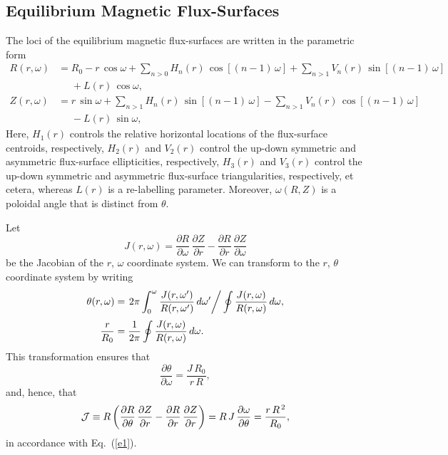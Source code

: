 \documentclass[12pt,prb,aps]{revtex4-1}
\begin{document}
\subsection{Equilibrium Magnetic Flux-Surfaces}
The loci of the equilibrium magnetic flux-surfaces are written in the parametric form\,\cite{con0,con,fitz93,greene,gim}
\begin{align}
R(r,\omega) &= R_0-r\,\cos\omega+\sum_{n>0}H_n(r)\,\cos[(n-1)\,\omega]+\sum_{n>1}V_n(r)\,\sin[(n-1)\,\omega]\nonumber\\[0.5ex]&
\phantom{=}+L(r)\,\cos\omega,\label{e10a}\\[0.5ex]
Z(r,\omega)&= r\,\sin\omega + \sum_{n>1}H_n(r)\,\sin[(n-1)\,\omega]- \sum_{n>1}V_n(r)\,\cos[(n-1)\,\omega]\nonumber\\[0.5ex]&\phantom{=}-L(r)\,\sin\omega,\label{e11a}
\end{align}
Here, $H_1(r)$  controls the relative horizontal locations of the flux-surface centroids, respectively, $H_2(r)$ and $V_2(r)$ control the 
up-down symmetric and asymmetric flux-surface ellipticities, respectively, $H_3(r)$ and
$V_3(r)$ control the up-down symmetric and asymmetric flux-surface triangularities, respectively, et cetera, whereas $L(r)$ is a
re-labelling parameter. Moreover, $\omega(R,Z)$ is a  poloidal angle that is distinct from $\theta$.

Let
\begin{equation}
J(r,\omega) = \frac{\partial R}{\partial\omega}\,\frac{\partial Z}{\partial r} -\frac{\partial R}{\partial r}\,\frac{\partial Z}{\partial \omega}
\end{equation}
be the Jacobian of the $r$, $\omega$ coordinate system. We can transform to the $r$, $\theta$ coordinate system 
by writing
\begin{align}\label{e11}
\theta(r,\omega) &= \left.2\pi\int_0^\omega \frac{J(r,\omega')}{R(r,\omega')}\,d\omega'\right/\oint\frac{J(r,\omega)}{R(r,\omega)}\,d\omega,\\[0.5ex]
\frac{r}{R_0}&=\frac{1}{2\pi}\oint\frac{J(r,\omega)}{R(r,\omega)}\,d\omega.\label{e12}
\end{align}
This transformation ensures that 
\begin{equation}
\frac{\partial\theta}{\partial\omega} = \frac{J\,R_0}{r\,R},
\end{equation}
and, hence, that 
\begin{equation}
{\cal J} \equiv R\left(\frac{\partial R}{\partial\theta}\,\frac{\partial Z}{\partial r} -\frac{\partial R}{\partial r}\,\frac{\partial Z}{\partial r}\right)
= R\,J\,\frac{\partial\omega}{\partial\theta} =\frac{r\,R^{\,2}}{R_0},
\end{equation}
in accordance with Eq.~(\ref{e1}). 
\end{document}
